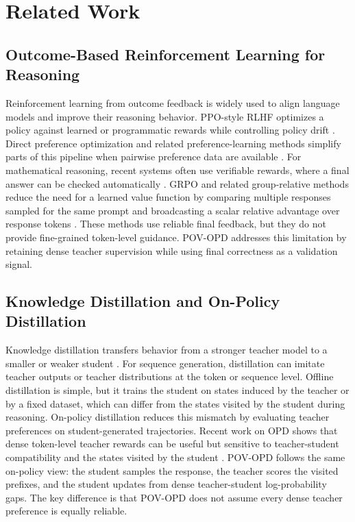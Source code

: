 \section{Related Work}

\subsection{Outcome-Based Reinforcement Learning for Reasoning}

Reinforcement learning from outcome feedback is widely used to align language models and improve their reasoning behavior. PPO-style RLHF optimizes a policy against learned or programmatic rewards while controlling policy drift \cite{christiano2017deep,schulman2017proximal,ouyang2022training}. Direct preference optimization and related preference-learning methods simplify parts of this pipeline when pairwise preference data are available \cite{rafailov2023direct}. For mathematical reasoning, recent systems often use verifiable rewards, where a final answer can be checked automatically \cite{shao2024deepseekmath,guo2025deepseekr1}. GRPO and related group-relative methods reduce the need for a learned value function by comparing multiple responses sampled for the same prompt and broadcasting a scalar relative advantage over response tokens \cite{shao2024deepseekmath}. These methods use reliable final feedback, but they do not provide fine-grained token-level guidance. POV-OPD addresses this limitation by retaining dense teacher supervision while using final correctness as a validation signal.

\subsection{Knowledge Distillation and On-Policy Distillation}

Knowledge distillation transfers behavior from a stronger teacher model to a smaller or weaker student \cite{hinton2015distilling}. For sequence generation, distillation can imitate teacher outputs or teacher distributions at the token or sequence level. Offline distillation is simple, but it trains the student on states induced by the teacher or by a fixed dataset, which can differ from the states visited by the student during reasoning. On-policy distillation reduces this mismatch by evaluating teacher preferences on student-generated trajectories. Recent work on OPD shows that dense token-level teacher rewards can be useful but sensitive to teacher-student compatibility and the states visited by the student \cite{li2026rethinkingopd}. POV-OPD follows the same on-policy view: the student samples the response, the teacher scores the visited prefixes, and the student updates from dense teacher-student log-probability gaps. The key difference is that POV-OPD does not assume every dense teacher preference is equally reliable.

